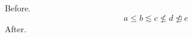 \documentclass[12pt]{article}
\begin{document}
Before.
\[ a \leqslant b \lesssim c \nleqslant d \ntrianglelefteq e \]
After.
\end{document}
